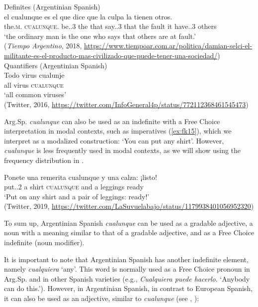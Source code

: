 \documentclass[output=paper,colorlinks,citecolor=brown]{langscibook}
\begin{document}
\ex\label{ex:fk13} Definites (Argentinian Spanish)\\
    \gll el cualunque es el que dice que la culpa la tienen otros.\\
    the.{\textsc{m}.\SG} {\textsc{cualunque}.\SG} {be.{\PRS.3\SG}} the that {say.{\PRS.3\SG}} that the fault it {have.{\PRS.3\SG}} others\\
    \glt ‘the ordinary man is the one who says that others are at fault.’\\
    (\textit{Tiempo Argentino}, 2018, \url{https://www.tiempoar.com.ar/politica/damian-selci-el-militante-es-el-producto-mas-civilizado-que-puede-tener-una-sociedad/})
\ex \label{ex:fk14} Quantifiers (Argentinian Spanish)\\
    \gll Todo virus cualunje\\
    all virus \textsc{cualunque}\\
    \glt ‘all common viruses’\\
    (Twitter, 2016, \url{https://twitter.com/InfoGeneral4p/status/772112368461545473})
\z

Arg.Sp. \textit{cualunque} can also be used as an indefinite with a Free Choice interpretation in modal contexts, such as imperatives (\ref{ex:fk15}), which we interpret as a modalized construction: ‘You can put any shirt’. However, \textit{cualunque} is less frequently used in modal contexts, as we will show using the frequency distribution in  . 

\ea\label{ex:fk15} 
    \gll Ponete una remerita cualunque y una calza: ¡listo!\\
    put.{\IMP.2\SG} a shirt \textsc{cualunque} and a leggings ready\\
    \glt ‘Put on any shirt and a pair of leggings: ready!’\\
    (Twitter, 2019, \url{https://twitter.com/LaSuvuelabajo/status/1179938401056952320})
\z

To sum up, Argentinian Spanish \textit{cualunque} can be used as a gradable adjective, a noun with a meaning similar to that of a gradable adjective, and as a Free Choice indefinite (noun modifier).\largerpage

It is important to note that Argentinian Spanish has another indefinite element, namely \textit{cualquiera} ‘any’. This word is normally used as a Free Choice pronoun in Arg.Sp. and in other Spanish varieties (e.g., \textit{Cualquiera puede hacerlo}. ‘Anybody can do this.’). However, in Argentinian Spanish, in contrast to European Spanish, it can also be used as an adjective, similar to \textit{cualunque} (see \cite{RizzoSalierno2013}, \cite{Kellert2021c}):
\end{document}

